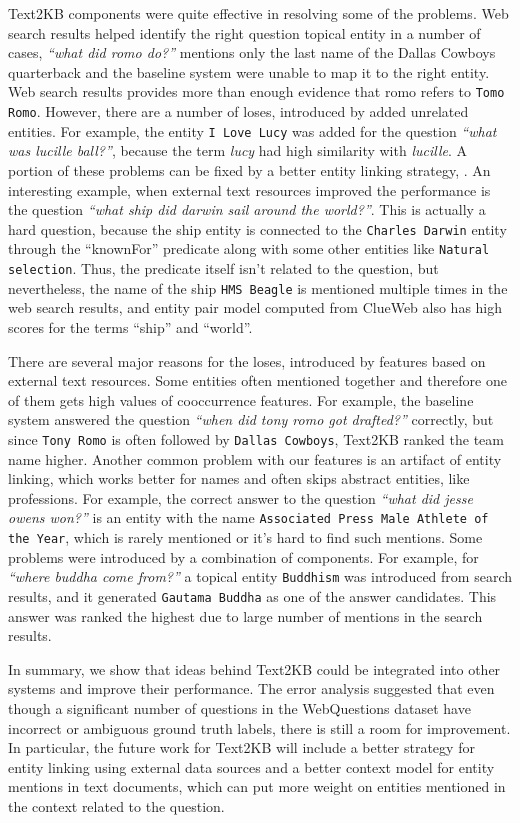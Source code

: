 Text2KB components were quite effective in resolving some of the problems.
Web search results helped identify the right question topical entity in a number of cases, \eg \textit{``what did romo do?''} mentions only the last name of the Dallas Cowboys quarterback and the baseline system were unable to map it to the right entity.
Web search results provides more than enough evidence that romo refers to \texttt{Tomo Romo}.
However, there are a number of loses, introduced by added unrelated entities.
For example, the entity \texttt{I Love Lucy} was added for the question \textit{``what was lucille ball?''}, because the term \textit{lucy} had high similarity with \textit{lucille}.
A portion of these problems can be fixed by a better entity linking strategy, \eg \cite{SMAPH_ERD:2014}.
An interesting example, when external text resources improved the performance is the question \textit{``what ship did darwin sail around the world?''}.
This is actually a hard question, because the ship entity is connected to the \texttt{Charles Darwin} entity through the ``knownFor'' predicate along with some other entities like \texttt{Natural selection}.
Thus, the predicate itself isn't related to the question, but nevertheless, the name of the ship \texttt{HMS Beagle} is mentioned multiple times in the web search results, and entity pair model computed from ClueWeb also has high scores for the terms ``ship'' and ``world''.

There are several major reasons for the loses, introduced by features based on external text resources.
Some entities often mentioned together and therefore one of them gets high values of cooccurrence features.
For example, the baseline system answered the question \textit{``when did tony romo got drafted?''} correctly, but since \texttt{Tony Romo} is often followed by \texttt{Dallas Cowboys}, Text2KB ranked the team name higher.
Another common problem with our features is an artifact of entity linking, which works better for names and often skips abstract entities, like professions.
For example, the correct answer to the question \textit{``what did jesse owens won?''} is an entity with the name \texttt{Associated Press Male Athlete of the Year}, which is rarely mentioned or it's hard to find such mentions.
Some problems were introduced by a combination of components.
For example, for \textit{``where buddha come from?''} a topical entity \texttt{Buddhism} was introduced from search results, and it generated \texttt{Gautama Buddha} as one of the answer candidates.
This answer was ranked the highest due to large number of mentions in the search results.

In summary, we show that ideas behind Text2KB could be integrated into other systems and improve their performance.
The error analysis suggested that even though a significant number of questions in the WebQuestions dataset have incorrect or ambiguous ground truth labels, there is still a room for improvement.
In particular, the future work for Text2KB will include a better strategy for entity linking using external data sources and a better context model for entity mentions in text documents, which can put more weight on entities mentioned in the context related to the question.
